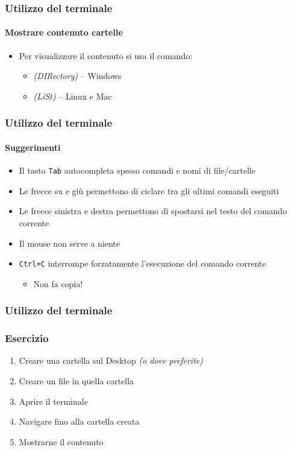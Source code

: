 \begin{contentframe}
    \frametitle{Utilizzo del terminale}
    \framesubtitle{Mostrare contenuto cartelle}

    \begin{itemize}
        \item Per visualizzare il contenuto si usa il comando:
        \begin{itemize}
            \item {} \textit{(DIRectory)} -- Windows
            \item {} \textit{(LiSt)} -- Linux e Mac
        \end{itemize}
    \end{itemize}
\end{contentframe}

\begin{contentframe}
    \frametitle{Utilizzo del terminale}
    \framesubtitle{Suggerimenti}

    \begin{itemize}
        \item Il tasto \texttt{Tab} autocompleta spesso comandi e nomi di file/cartelle

        \bigskip
        \item Le frecce su e giù permettono di ciclare tra gli ultimi comandi eseguiti
        \item Le frecce sinistra e destra permettono di spostarsi nel testo del comando corrente
        
        \bigskip
        \item Il mouse non serve a niente

        \bigskip
        \item \texttt{Ctrl+C} interrompe forzatamente l'esecuzione del comando corrente
        \begin{itemize}
            \item Non fa copia!
        \end{itemize}
    \end{itemize}
\end{contentframe}

\begin{exerciseframe}
    \frametitle{Utilizzo del terminale}
    \frametitle{Esercizio}

    \begin{enumerate}
        \item Creare una cartella sul Desktop \textit{(o dove preferite)}
        \item Creare un file in quella cartella
        \item Aprire il terminale
        \item Navigare fino alla cartella creata
        \item Mostrarne il contenuto
    \end{enumerate}
\end{exerciseframe}

